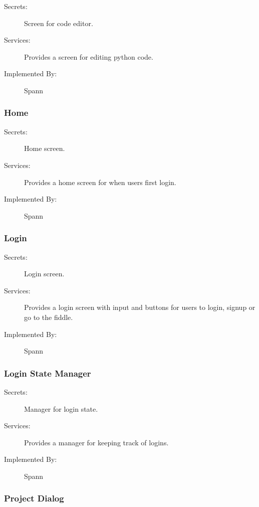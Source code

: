 \documentclass[12pt, titlepage]{article}
\begin{document}
\begin{description}
\item[Secrets:] Screen for code editor.
\item[Services:] Provides a screen for editing python code.
\item[Implemented By:] Spann
\end{description}

\subsubsection{Home} \label{mdHome} 

\begin{description}
\item[Secrets:] Home screen.
\item[Services:] Provides a home screen for when users first login.
\item[Implemented By:] Spann
\end{description}

\subsubsection{Login} \label{mdLogin} 

\begin{description}
\item[Secrets:] Login screen.
\item[Services:] Provides a login screen with input and buttons for users to login,
    signup or go to the fiddle.
\item[Implemented By:] Spann
\end{description}

\subsubsection{Login State Manager} \label{mdLoginStateManager}

\begin{description}
\item[Secrets:] Manager for login state.
\item[Services:] Provides a manager for keeping track of logins.
\item[Implemented By:] Spann
\end{description}

\subsubsection{Project Dialog} \label{mdProjectDialog} 
\end{document}
